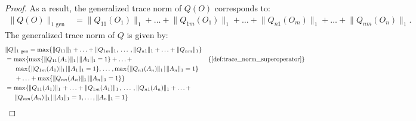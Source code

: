 \begin{proof}
  As a result, the generalized trace norm of $Q(O)$ corresponds to:
  \begin{equation} \label{eq:qo}
    \begin{split}
    \lVert Q(O)  \rVert_{1 \text{ gen}} & = \lVert Q_{11} (O_{1}) \rVert_{1} + \ldots + \lVert Q_{1m} (O_{1}) \rVert_{1} + \ldots +  \lVert Q_{n1} (O_{m})  \rVert_{1} +  \ldots +  \lVert Q_{nm} (O_{n}) \rVert_{1}. 
    \end{split}
  \end {equation}
  The generalized trace norm of $Q$ is given by:
  \begin{equation}
    \begin{split} \label{eq:q}
    &\lVert Q  \rVert_{1 \text{ gen}} = \max \{ \lVert Q_{11} \rVert_{1} + \ldots + \lVert Q_{1m} \rVert_{1}, \hspace{2pt} \ldots \hspace{2pt}, \lVert Q_{n1} \rVert_{1} + \ldots + \lVert Q_{nm} \rVert_{1} \} \\
   & = \max \{ \max \{ \lVert Q_{11} (A_{1}) \rVert_{1} \hspace{1pt}  \vert \hspace{1pt}  \lVert A_{1} \rVert_{1} = 1 \} + \ldots + &  \{\text{\autoref{def:trace_norm_superoperator}}\} \\
   & \hspace{15pt}  \max \{  \lVert Q_{1m} (A_{1}) \rVert_{1} \hspace{1pt}  \vert   \lVert A_{1} \rVert_{1} = 1 \} , \hspace{1pt} \ldots \hspace{1pt}, \max \{ \lVert Q_{n1} (A_{n}) \rVert_{1} \hspace{1pt}  \vert \hspace{1pt}  \lVert A_{n} \rVert_{1} = 1 \}   \\
   &\hspace{15pt} + \ldots +  \max \{ \lVert Q_{nn} (A_{n}) \rVert_{1} \hspace{1pt}  \vert \lVert A_{n} \rVert_{1} = 1 \}\}\\
   & = \max \{ \lVert Q_{11} (A_{1}) \rVert_{1} \hspace{1pt}  + \ldots +  \lVert Q_{1m} (A_{1}) \rVert_{1} \hspace{1pt} , \hspace{2pt} \ldots \hspace{2pt}, \lVert Q_{n1} (A_{n}) \rVert_{1}  + \ldots +  \\
   & \hspace{15pt} \lVert Q_{nm} (A_{n}) \rVert_{1} \hspace{1pt}  \vert \hspace{1pt}   \lVert A_{1} \rVert_{1} = 1, \ldots, \lVert A_{n} \rVert_{1} = 1 \}
    \end{split}
  \end{equation}
  

\end{proof}
